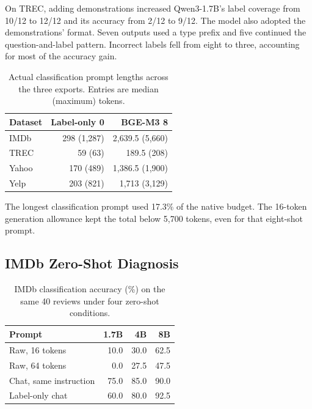 \documentclass{article}
\begin{document}
On TREC, adding demonstrations increased Qwen3-1.7B's label coverage from 10/12 to 12/12 and
its accuracy from 2/12 to 9/12. The model also adopted the demonstrations' format. Seven
outputs used a type prefix and five continued the question-and-label pattern. Incorrect
labels fell from eight to three, accounting for most of the accuracy gain.

\begin{table}[H]
\centering
\caption{Actual classification prompt lengths across the three exports. Entries are median (maximum)
tokens.}
\small
\begin{tabular*}{\columnwidth}{@{\extracolsep{\fill}}lrr@{}}
\toprule
\textbf{Dataset} & \textbf{Label-only 0} & \textbf{BGE-M3 8} \\
\midrule
IMDb & 298 (1,287) & 2,639.5 (5,660) \\
TREC & 59 (63) & 189.5 (208) \\
Yahoo & 170 (489) & 1,386.5 (1,900) \\
Yelp & 203 (821) & 1,713 (3,129) \\
\bottomrule
\end{tabular*}
\end{table}

The longest classification prompt used 17.3\% of the native budget. The 16-token generation
allowance kept the total below 5,700 tokens, even for that eight-shot prompt.

\newpage

\subsection{IMDb Zero-Shot Diagnosis}

\begin{table}[H]
\centering
\caption{IMDb classification accuracy (\%) on the same 40 reviews under four zero-shot conditions.}
\small
\begin{tabular*}{\columnwidth}{@{\extracolsep{\fill}}lrrr@{}}
\toprule
\textbf{Prompt} & \textbf{1.7B} & \textbf{4B} & \textbf{8B} \\
\midrule
Raw, 16 tokens & 10.0 & 30.0 & 62.5 \\
Raw, 64 tokens & 0.0 & 27.5 & 47.5 \\
Chat, same instruction & 75.0 & 85.0 & 90.0 \\
Label-only chat & 60.0 & 80.0 & 92.5 \\
\bottomrule
\end{tabular*}
\end{table}
\end{document}
